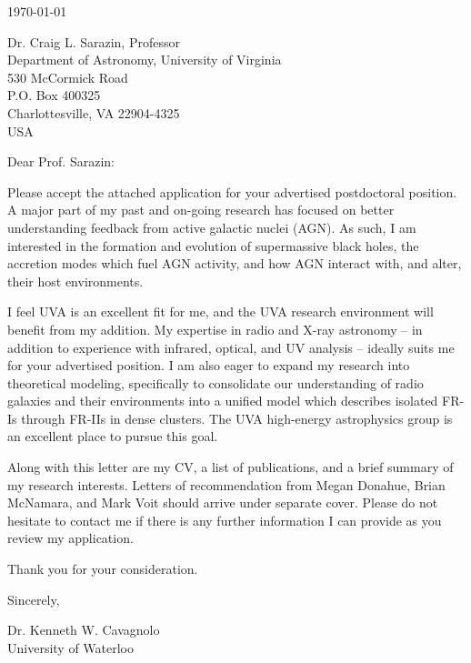 \documentclass[12pt]{article}
\begin{document}
\today

Dr. Craig L. Sarazin, Professor\\
Department of Astronomy, University of Virginia\\
530 McCormick Road\\
P.O. Box 400325\\
Charlottesville, VA 22904-4325\\
USA

Dear Prof. Sarazin:

Please accept the attached application for your advertised
postdoctoral position. A major part of my past and on-going research
has focused on better understanding feedback from active galactic
nuclei (AGN). As such, I am interested in the formation and evolution
of supermassive black holes, the accretion modes which fuel AGN
activity, and how AGN interact with, and alter, their host
environments.

I feel UVA is an excellent fit for me, and the UVA research
environment will benefit from my addition. My expertise in radio and
X-ray astronomy -- in addition to experience with infrared, optical,
and UV analysis -- ideally suits me for your advertised position. I am
also eager to expand my research into theoretical modeling,
specifically to consolidate our understanding of radio galaxies and
their environments into a unified model which describes isolated FR-Is
through FR-IIs in dense clusters. The UVA high-energy astrophysics
group is an excellent place to pursue this goal.

Along with this letter are my CV, a list of publications, and a brief
summary of my research interests. Letters of recommendation from Megan
Donahue, Brian McNamara, and Mark Voit should arrive under separate
cover. Please do not hesitate to contact me if there is any further
information I can provide as you review my application.

Thank you for your consideration.

Sincerely,\\
\begin{minipage}{7.5in}
\end{minipage}
Dr. Kenneth W. Cavagnolo\\
University of Waterloo
\end{document}
